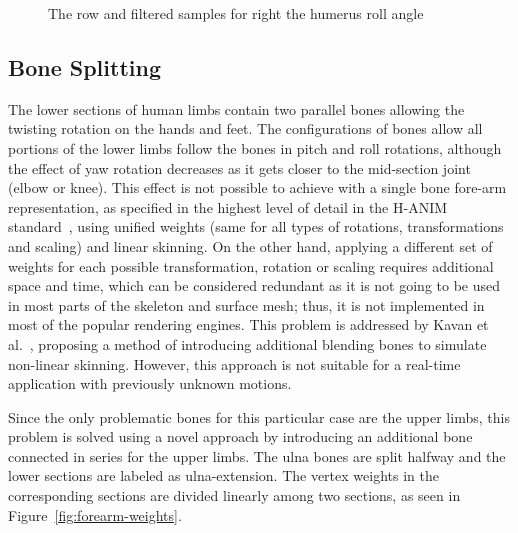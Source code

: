 \begin{figure}[htbp]
	\centerline{ 
	}
\caption{The row and filtered samples for right the humerus roll angle}
	\label{fig:rotation-filter}
\end{figure}


\subsection {Bone Splitting}
\label{subsection_bone_splitting}
The lower sections of human limbs contain two parallel bones allowing the twisting rotation on the hands and feet. The configurations of bones allow all portions of the lower limbs follow the bones in pitch and roll rotations, although the effect of yaw rotation decreases as it gets closer to the mid-section joint (elbow or knee). This effect is not possible to achieve with a single bone fore-arm representation, as specified in the highest level of detail in the H-ANIM standard~\cite{HANIM}, using unified weights (same for all types of rotations, transformations and scaling) and linear skinning. On the other hand, applying a different set of weights for each possible  transformation, rotation or scaling requires additional space and time, which can be considered redundant as it is not going to be used in most parts of the skeleton and surface mesh; thus, it is not implemented in most of the popular rendering engines. This problem is addressed by Kavan et al.~\cite{Kavan2009}, proposing a method of introducing additional blending bones to simulate non-linear skinning. However, this approach is not suitable for a real-time application with previously unknown motions. 

Since the only problematic bones for this particular case are the upper limbs, this problem is solved using a novel approach by introducing an additional bone connected in series for the upper limbs. The ulna bones are split halfway and the lower sections are labeled as ulna-extension. The vertex weights in the corresponding sections are divided linearly among two sections, as seen in Figure~\ref{fig:forearm-weights}. 


